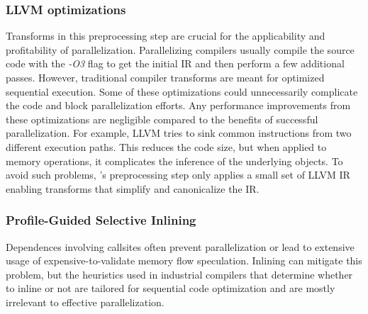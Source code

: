 \subsubsection{LLVM optimizations}

Transforms in this preprocessing step are crucial for the
applicability and profitability of parallelization.
%
Parallelizing compilers usually compile the source code with the \textit{-O3}
flag to get the initial IR and then perform a few additional
passes.
However, traditional compiler transforms are meant for optimized
sequential execution.
%
Some of these optimizations could unnecessarily complicate the code
and block parallelization efforts.
%
Any performance improvements from these optimizations are negligible
compared to the benefits of successful parallelization.
%
For example, LLVM tries to sink common instructions from two different
execution paths. This reduces the code size, but when applied to memory
operations, it complicates the inference of the underlying objects.
%
To avoid such problems, \namensp 's preprocessing step only applies a
small set of LLVM IR enabling transforms that simplify and
canonicalize the IR.



\subsubsection{Profile-Guided Selective Inlining}

%
Dependences involving callsites often prevent parallelization or lead
to extensive usage of expensive-to-validate memory flow speculation.
%
Inlining can mitigate this problem, but the heuristics used in
industrial compilers that determine whether to inline or not are tailored
for sequential code optimization and are mostly irrelevant to
effective parallelization.
%
%
%

